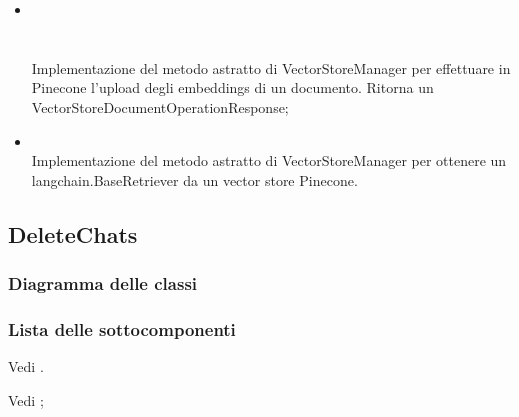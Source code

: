 \documentclass[10pt, a4paper]{article}
\begin{document}
\begin{itemize}
\begin{itemize}
        \item {}\\ 
        \\ 
        \\ 
        Implementazione del metodo astratto di VectorStoreManager per effettuare in Pinecone l'upload degli embeddings di un documento. Ritorna un VectorStoreDocumentOperationResponse;
        \item {}\\
        Implementazione del metodo astratto di VectorStoreManager per ottenere un langchain.BaseRetriever da un vector store Pinecone.
    \end{itemize}
\end{itemize}






\subsection{DeleteChats}
\subsubsection{Diagramma delle classi}
\subsubsection{Lista delle sottocomponenti}

Vedi .

Vedi ;
\end{document}
